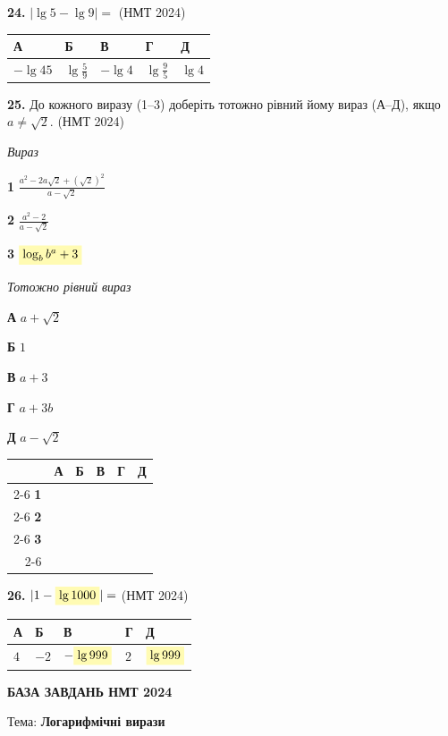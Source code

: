 \documentclass[14pt]{extarticle}
\newcommand{\answerGrid}{
    \begingroup
    \renewcommand{\arraystretch}{1.3} 
    \setlength{\tabcolsep}{7pt} 
    \begin{tabular}{r|c|c|c|c|c|}
         \multicolumn{1}{c}{} & \multicolumn{1}{c}{\textbf{А}} & \multicolumn{1}{c}{\textbf{Б}} & \multicolumn{1}{c}{\textbf{В}} & \multicolumn{1}{c}{\textbf{Г}} & \multicolumn{1}{c}{\textbf{Д}} \\ \cline{2-6}
         \textbf{1} & & & & & \\ \cline{2-6}
         \textbf{2} & & & & & \\ \cline{2-6}
         \textbf{3} & & & & & \\ \cline{2-6}
    \end{tabular}
    \endgroup
}
\newcommand{\matchingLayout}[3]{
    \noindent
    \begin{minipage}[t]{0.40\textwidth}
        #1
    \end{minipage}%
    \hfill
    \begin{minipage}[t]{0.28\textwidth}
        #2
    \end{minipage}%
    \hfill
    \begin{minipage}[t]{0.30\textwidth}
        \vspace{0pt}
        \begin{flushright}
        #3
        \end{flushright}
    \end{minipage}
}
\newcommand{\answerTable}[5]{
\begin{center}
\begin{tabular}{|*{5}{>{\centering\arraybackslash}m{2.8cm}|}}
\hline
\rule[-0.3cm]{0pt}{0.8cm}\textbf{А} & \textbf{Б} & \textbf{В} & \textbf{Г} & \textbf{Д} \\
\hline
\rule[-0.4cm]{0pt}{1.0cm}#1 & \rule[-0.4cm]{0pt}{1.0cm}#2 & \rule[-0.4cm]{0pt}{1.0cm}#3 & \rule[-0.4cm]{0pt}{1.0cm}#4 & \rule[-0.4cm]{0pt}{1.0cm}#5 \\
\hline
\end{tabular}
\end{center}
}
\newcommand{\answerTableTall}[5]{
\begin{center}
\begin{tabular}{|*{5}{>{\centering\arraybackslash}m{2.8cm}|}}
\hline
\rule[-0.3cm]{0pt}{0.8cm}\textbf{А} & \textbf{Б} & \textbf{В} & \textbf{Г} & \textbf{Д} \\
\hline
\rule[-0.9cm]{0pt}{2.0cm}#1 & 
\rule[-0.9cm]{0pt}{2.0cm}#2 & 
\rule[-0.9cm]{0pt}{2.0cm}#3 & 
\rule[-0.9cm]{0pt}{2.0cm}#4 & 
\rule[-0.9cm]{0pt}{2.0cm}#5 \\
\hline
\end{tabular}
\end{center}
}
\newcommand{\nmtyear}[1]{\hfill{\small\color{yearcolor}(НМТ #1)}}
\begin{document}
\vspace{0.8cm}

\noindent\textbf{24.} $|\lg 5 - \lg 9| = $ \nmtyear{2024}
\vspace{0.3cm}

\answerTableTall{$-\lg 45$}{$\lg \displaystyle\frac{5}{9}$}{$-\lg 4$}{$\lg \displaystyle\frac{9}{5}$}{$\lg 4$}

\vspace{0.5cm}

\noindent\textbf{25.} До кожного виразу (1--3) доберіть тотожно рівний йому вираз (А--Д), якщо $a \neq \sqrt{2}$. \nmtyear{2024}
\vspace{0.3cm}

\matchingLayout{
\textit{Вираз}

\textbf{1} \quad $\displaystyle\frac{a^2 - 2a\sqrt{2} + (\sqrt{2})^2}{a - \sqrt{2}}$

\textbf{2} \quad $\displaystyle\frac{a^2 - 2}{a - \sqrt{2}}$

\textbf{3} \quad $\colorbox{yellow!30}{$\log_b b^a + 3$}$
}{
\textit{Тотожно рівний вираз}

\textbf{А} \quad $a + \sqrt{2}$

\textbf{Б} \quad $1$

\textbf{В} \quad $a + 3$

\textbf{Г} \quad $a + 3b$

\textbf{Д} \quad $a - \sqrt{2}$
}{
\answerGrid
}

\vspace{0.8cm}

\noindent\textbf{26.} $|1 - \colorbox{yellow!30}{$\lg 1000$}| = $ \nmtyear{2024}
\vspace{0.3cm}

\answerTable{$4$}{$-2$}{$-\colorbox{yellow!30}{$\lg 999$}$}{$2$}{$\colorbox{yellow!30}{$\lg 999$}$}



\newpage

\begin{center}
{\Large\textbf{\color{headerblue}БАЗА ЗАВДАНЬ НМТ 2024}}
\end{center}

\begin{center}
{\large Тема: \textbf{Логарифмічні вирази}}
\end{center}

\vspace{0.5cm}
\end{document}
